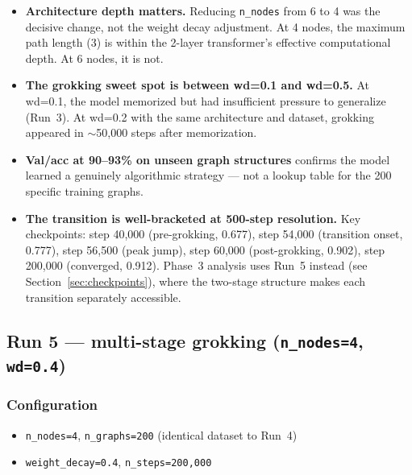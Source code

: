 \documentclass[11pt, a4paper]{article}
\begin{document}
\begin{itemize}[noitemsep]
  \item \textbf{Architecture depth matters.} Reducing \texttt{n\_nodes} from 6
        to 4 was the decisive change, not the weight decay adjustment. At 4
        nodes, the maximum path length (3) is within the 2-layer transformer's
        effective computational depth. At 6 nodes, it is not.

  \item \textbf{The grokking sweet spot is between wd=0.1 and wd=0.5.} At
        wd=0.1, the model memorized but had insufficient pressure to generalize
        (Run~3). At wd=0.2 with the same architecture and dataset, grokking
        appeared in $\sim$50{,}000 steps after memorization.

  \item \textbf{Val/acc at 90--93\% on unseen graph structures} confirms the
        model learned a genuinely algorithmic strategy --- not a lookup table
        for the 200 specific training graphs.

  \item \textbf{The transition is well-bracketed at 500-step resolution.}
        Key checkpoints: step 40{,}000 (pre-grokking, 0.677), step 54{,}000
        (transition onset, 0.777), step 56{,}500 (peak jump), step 60{,}000
        (post-grokking, 0.902), step 200{,}000 (converged, 0.912). Phase~3
        analysis uses Run~5 instead (see Section~\ref{sec:checkpoints}), where
        the two-stage structure makes each transition separately accessible.
\end{itemize}

\subsection{Run 5 --- multi-stage grokking (\texttt{n\_nodes=4}, \texttt{wd=0.4})}

\subsubsection{Configuration}

\begin{itemize}[noitemsep]
  \item \texttt{n\_nodes=4}, \texttt{n\_graphs=200}
        (identical dataset to Run~4)
  \item \texttt{weight\_decay=0.4}, \texttt{n\_steps=200{,}000}
\end{itemize}
\end{document}
